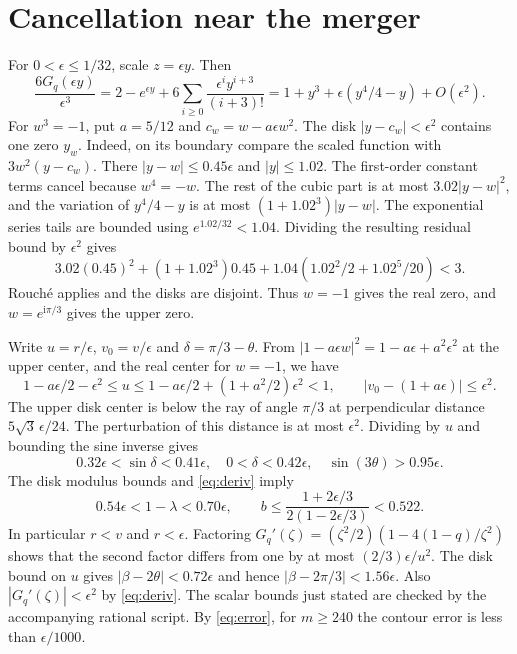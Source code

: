 \documentclass[11pt]{article}
\newcommand{\ii}{\mathrm{i}}
\begin{document}
\section{Cancellation near the merger}

For \(0<\epsilon\le1/32\), scale \(z=\epsilon y\). Then
\[
 \frac{6G_q(\epsilon y)}{\epsilon^3}
 =2-e^{\epsilon y}
   +6\sum_{i\ge0}\frac{\epsilon^i y^{i+3}}{(i+3)!}
 =1+y^3+\epsilon(y^4/4-y)+O(\epsilon^2).
\]
For \(w^3=-1\), put \(a=5/12\) and \(c_w=w-a\epsilon w^2\).
The disk \(|y-c_w|<\epsilon^2\) contains one zero \(y_w\).
Indeed, on its boundary compare the scaled function with
\(3w^2(y-c_w)\). There \(|y-w|\le0.45\epsilon\) and
\(|y|\le1.02\). The first-order constant terms cancel
because \(w^4=-w\). The rest of the cubic part is at most
\(3.02|y-w|^2\), and the variation of \(y^4/4-y\) is
at most \((1+1.02^3)|y-w|\). The exponential series tails
are bounded using \(e^{1.02/32}<1.04\). Dividing the resulting
residual bound by \(\epsilon^2\) gives
\[
 3.02(0.45)^2+(1+1.02^3)0.45+
 1.04(1.02^2/2+1.02^5/20)<3 .
\]
Rouch\'e applies and the disks are disjoint. Thus \(w=-1\)
gives the real zero, and \(w=e^{\ii\pi/3}\) gives the upper zero.

Write \(u=r/\epsilon\), \(v_0=v/\epsilon\) and
\(\delta=\pi/3-\theta\). From
\(|1-a\epsilon w|^2=1-a\epsilon+a^2\epsilon^2\) at the upper
center, and the real center for \(w=-1\), we have
\[
 1-a\epsilon/2-\epsilon^2\le u
 \le1-a\epsilon/2+(1+a^2/2)\epsilon^2<1,\qquad
 |v_0-(1+a\epsilon)|\le\epsilon^2 .
\]
The upper disk center is below the ray of angle \(\pi/3\)
at perpendicular distance \(5\sqrt3\,\epsilon/24\).
The perturbation of this distance is at most \(\epsilon^2\).
Dividing by \(u\) and bounding the sine inverse gives
\[
 0.32\epsilon<\sin\delta<0.41\epsilon,\quad
 0<\delta<0.42\epsilon,\quad \sin(3\theta)>0.95\epsilon.
\]
The disk modulus bounds and \eqref{eq:deriv} imply
\[
 0.54\epsilon<1-\lambda<0.70\epsilon,\qquad
 b\le\frac{1+2\epsilon/3}{2(1-2\epsilon/3)}<0.522 .
\]
In particular \(r<v\) and \(r<\epsilon\).
Factoring \(G_q'(\zeta)=(\zeta^2/2)(1-4(1-q)/\zeta^2)\)
shows that the second factor differs from one by at most
\((2/3)\epsilon/u^2\). The disk bound on \(u\) gives
\(|\beta-2\theta|<0.72\epsilon\) and hence
\(|\beta-2\pi/3|<1.56\epsilon\).
Also \(|G_q'(\zeta)|<\epsilon^2\) by \eqref{eq:deriv}.
The scalar bounds just stated are checked by the accompanying
rational script. By \eqref{eq:error}, for \(m\ge240\) the
contour error is less than \(\epsilon/1000\).
\end{document}
